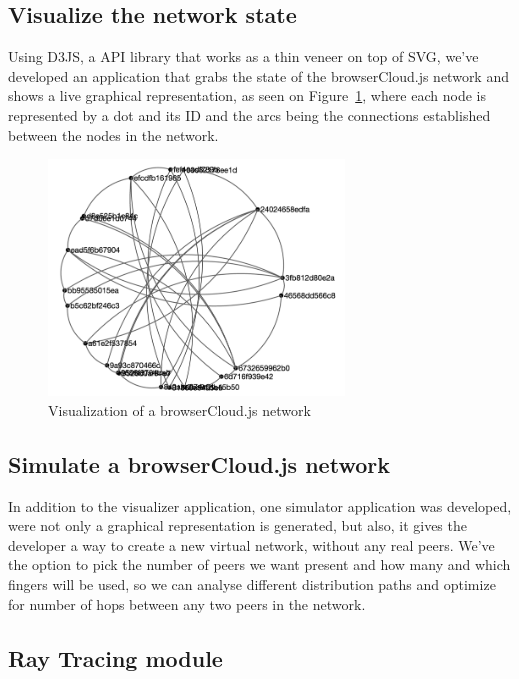\subsection{Visualize the network state}

Using D3JS, a API library that works as a thin veneer on top of SVG, we've developed an application that grabs the state of the browserCloud.js network and shows a live graphical representation, as seen on Figure~\ref{fig:visualizer}, where each node is represented by a dot and its ID and the arcs being the connections established between the nodes in the network.

\begin{figure}[h!]
  \centering
  \includegraphics[width=0.7\textwidth]{figs/visualizer}
  \caption{Visualization of a browserCloud.js network}
  \label{fig:visualizer}
\end{figure}

\subsection{Simulate a browserCloud.js network}

In addition to the visualizer application, one simulator application was developed, were not only a graphical representation is generated, but also, it gives the developer a way to create a new virtual network, without any real peers. We've the option to pick the number of peers we want present and how many and which fingers will be used, so we can analyse different distribution paths and optimize for number of hops between any two peers in the network.

\subsection{Ray Tracing module}

